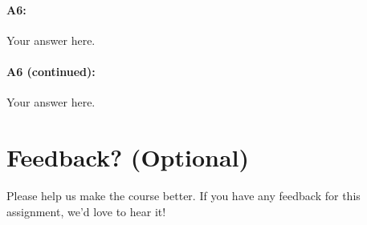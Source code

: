 \paragraph{A6:} Your answer here.







\pagebreak
\paragraph{A6 (continued):} Your answer here.







\pagebreak
\section*{Feedback? (Optional)}
Please help us make the course better. If you have any feedback for this assignment, we'd love to hear it!





